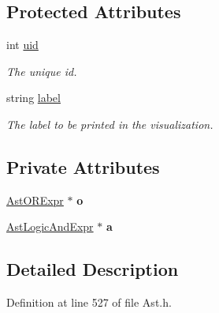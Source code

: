 \subsection*{Protected Attributes}
\begin{DoxyCompactItemize}
\item 
\hypertarget{classAST_a847b778f1c3dd5a19de32de432ee6e15}{int \hyperlink{classAST_a847b778f1c3dd5a19de32de432ee6e15}{uid}}\label{classAST_a847b778f1c3dd5a19de32de432ee6e15}

\begin{DoxyCompactList}\small\item\em The unique id. \end{DoxyCompactList}\item 
\hypertarget{classAST_ab2e239ccc0688d2341724432ff5a1a31}{string \hyperlink{classAST_ab2e239ccc0688d2341724432ff5a1a31}{label}}\label{classAST_ab2e239ccc0688d2341724432ff5a1a31}

\begin{DoxyCompactList}\small\item\em The label to be printed in the visualization. \end{DoxyCompactList}\end{DoxyCompactItemize}
\subsection*{Private Attributes}
\begin{DoxyCompactItemize}
\item 
\hypertarget{classAstLogicAndExpr_a047e943362c7d33c78344b46ad69392c}{\hyperlink{classAstORExpr}{Ast\-O\-R\-Expr} $\ast$ {\bfseries o}}\label{classAstLogicAndExpr_a047e943362c7d33c78344b46ad69392c}

\item 
\hypertarget{classAstLogicAndExpr_a74a88c78a3c3e0d185ceb216f8e979d4}{\hyperlink{classAstLogicAndExpr}{Ast\-Logic\-And\-Expr} $\ast$ {\bfseries a}}\label{classAstLogicAndExpr_a74a88c78a3c3e0d185ceb216f8e979d4}

\end{DoxyCompactItemize}


\subsection{Detailed Description}


Definition at line 527 of file Ast.\-h.



